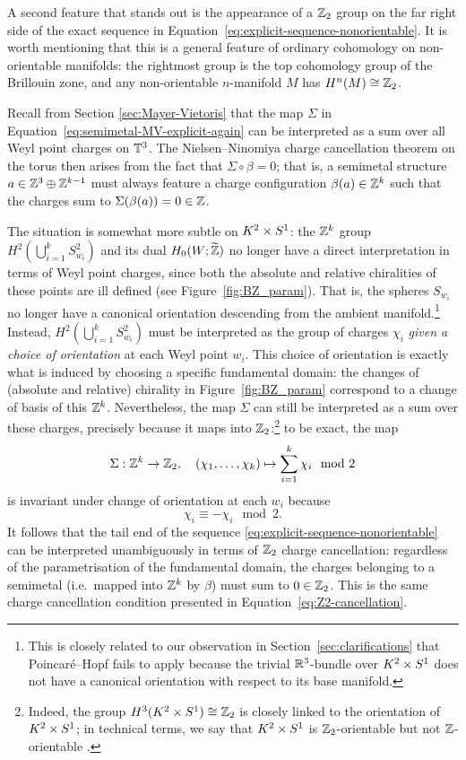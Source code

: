 A second feature that stands out is the appearance of a $\mathbb{Z}_2$ group on the far right side of the exact sequence in Equation~\eqref{eq:explicit-sequence-nonorientable}. It is worth mentioning that this is a general feature of ordinary cohomology on non-orientable manifolds: the rightmost group is the top cohomology group of the Brillouin zone, and any non-orientable $n$-manifold $M$ has $H^n(M)\cong\mathbb{Z}_2$.

Recall from Section \ref{sec:Mayer-Vietoris} that the map $\Sigma$ in Equation~\eqref{eq:semimetal-MV-explicit-again} can be interpreted as a sum over all Weyl point charges on $\mathbb{T}^3$. The Nielsen--Ninomiya charge cancellation theorem on the torus then arises from the fact that $\Sigma\circ\beta = 0$; that is, a semimetal structure $a\in\mathbb{Z}^3\oplus\mathbb{Z}^{k-1}$ must always feature a charge configuration $\beta(a)\in\mathbb{Z}^k$ such that the charges sum to $\Sigma(\beta(a)) = 0 \in \mathbb{Z}$.

The situation is somewhat more subtle on $K^2\times S^1$: the $\mathbb{Z}^k$ group $H^2\!\left(\bigcup_{i=1}^k S_{w_i}^2\right)$ and its dual $H_0(W;\widetilde{\mathbb{Z}})$ no longer have a direct interpretation in terms of Weyl point charges, since both the absolute and relative chiralities of these points are ill defined (see Figure~\ref{fig:BZ_param}). That is, the spheres $S_{w_i}$ no longer have a canonical orientation descending from the ambient manifold.\footnote{
	This is closely related to our observation in Section~\ref{sec:clarifications} that Poincaré--Hopf fails to apply because the trivial $\mathbb{R}^3$-bundle over $K^2\times S^1$ does not have a canonical orientation with respect to its base manifold.}
Instead, $H^2\!\left(\bigcup_{i=1}^k S_{w_i}^2\right)$ must be interpreted as the group of charges $\chi_i$ \emph{given a choice of orientation} at each Weyl point $w_i$. This choice of orientation is exactly what is induced by choosing a specific fundamental domain: the changes of (absolute and relative) chirality in Figure~\ref{fig:BZ_param} correspond to a change of basis of this $\mathbb{Z}^k$. Nevertheless, the map $\Sigma$ can still be interpreted as a sum over these charges, precisely because it maps into $\mathbb{Z}_2$:\footnote{
	Indeed, the group $H^3(K^2\times S^1)\cong\mathbb{Z}_2$ is closely linked to the orientation of $K^2\times S^1$; in technical terms, we say that $K^2\times S^1$ is $\mathbb{Z}_2$-orientable but not $\mathbb{Z}$-orientable \parencite[\S 3.3]{Hatcher_algebraic-topology}.}
to be exact, the map
\begin{equation}\label{eq:map-sigma}
	\Sigma: \mathbb{Z}^k\to\mathbb{Z}_2,\quad (\chi_1,\ldots,\chi_k) \mapsto \sum_{i=1}^{k}\chi_i \mod 2
\end{equation}
is invariant under change of orientation at each $w_i$ because
\begin{equation*}
	\chi_i \equiv -\chi_i \mod 2.
\end{equation*}
It follows that the tail end of the sequence \eqref{eq:explicit-sequence-nonorientable} can be interpreted unambiguously in terms of $\mathbb{Z}_2$ charge cancellation: regardless of the parametrisation of the fundamental domain, the charges belonging to a semimetal (i.e.\ mapped into $\mathbb{Z}^k$ by $\beta$) must sum to $0\in\mathbb{Z}_2$. This is the same charge cancellation condition presented in Equation~\eqref{eq:Z2-cancellation}.

